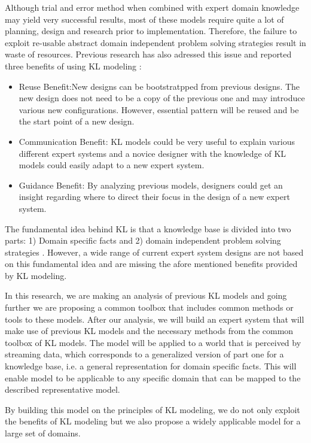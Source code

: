 \documentclass[conference]{IEEEtran}
\begin{document}
Although trial and error method when combined with expert domain
knowledge may yield very successful results, most of these models
require quite a lot of planning, design and research prior to
implementation.  Therefore, the failure to exploit re-usable abstract
domain independent problem solving strategies result in waste of
resources.  Previous research has also adressed this issue and
reported three benefits of using KL modeling
\cite{Menzies97object-orientedpatterns:}:
\begin{itemize}
\item Reuse Benefit:New designs can be bootstratpped from previous designs. 
The new design does not need to be a copy of the previous one and may introduce various new configurations.
However, essential pattern will be reused and be the start point of a new design.
\item Communication Benefit: KL models could be very useful to explain various different expert systems and a novice designer with the knowledge of KL models could easily adapt to a new expert system.
\item Guidance Benefit: By analyzing previous models, designers could get an insight regarding where to direct their focus in the design of a new expert system.
\end{itemize}

The fundamental idea behind KL is that a knowledge base is divided
into two parts: 1) Domain specific facts and 2) domain independent
problem solving strategies \cite{Menzies1996}.  However, a wide range
of current expert system designs are not based on this fundamental
idea and are missing the afore mentioned benefits provided by KL
modeling.

In this research, we are making an analysis of previous KL models and
going further we are proposing a common toolbox that includes common
methods or tools to these models.  After our analysis, we will build
an expert system that will make use of previous KL models and the
necessary methods from the common toolbox of KL models.  The model
will be applied to a world that is perceived by streaming data, which
corresponds to a generalized version of part one for a knowledge base,
i.e. a general representation for domain specific facts.  This will
enable model to be applicable to any specific domain that can be
mapped to the described representative model.

By building this model on the principles of KL modeling, we do not
only exploit the benefits of KL modeling but we also propose a widely
applicable model for a large set of domains.
\end{document}
